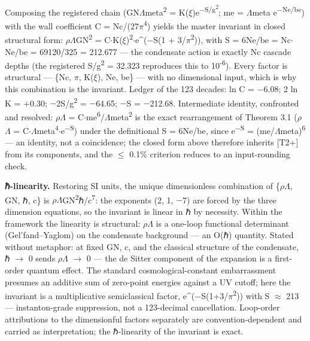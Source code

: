 \documentclass[11pt,letterpaper]{article}
\begin{document}
\noindent Composing the registered chain (GN$\Lambda$meta\textsuperscript{2} = K($\xi$)e\textsuperscript{$-$S/g\textsuperscript{2}}; me = $\Lambda$meta e\textsuperscript{$-$Ne/be}) with the wall coefficient C = Nc/(27$\pi$\textsuperscript{4}) yields the master invariant in closed structural form: $\rho$$\Lambda$GN\textsuperscript{2} = C$\cdot$K($\xi$)\textsuperscript{2}$\cdot$e\textasciicircum{}($-$S(1 + 3/$\pi$\textsuperscript{2})), with S = 6Ne/be = Nc$\cdot$Ne/be = 69120/325 = 212.677 --- the condensate action is exactly Nc cascade depths (the registered S/g\textsuperscript{2} = 32.323 reproduces this to 10\textsuperscript{-6}). Every factor is structural --- \{Nc, $\pi$, K($\xi$), Ne, be\} --- with no dimensional input, which is why this combination is the invariant. Ledger of the 123 decades: ln C = $-$6.08; 2 ln K = +0.30; $-$2S/g\textsuperscript{2} = $-$64.65; $-$S = $-$212.68. Intermediate identity, confronted and resolved: $\rho$$\Lambda$ = C$\cdot$me\textsuperscript{6}/$\Lambda$meta\textsuperscript{2} is the exact rearrangement of Theorem 3.1 ($\rho$$\Lambda$ = C$\cdot$$\Lambda$meta\textsuperscript{4}$\cdot$e\textsuperscript{$-$S}) under the definitional S = 6Ne/be, since e\textsuperscript{$-$S} = (me/$\Lambda$meta)\textsuperscript{6} --- an identity, not a coincidence; the closed form above therefore inherits [T2+] from its components, and the $\le$ 0.1\% criterion reduces to an input-rounding check.

\noindent \textbf{ℏ-linearity. }Restoring SI units, the unique dimensionless combination of \{$\rho$$\Lambda$, GN, ℏ, c\} is $\rho$$\Lambda$GN\textsuperscript{2}ℏ/c\textsuperscript{7}: the exponents (2, 1, $-$7) are forced by the three dimension equations, so the invariant is linear in ℏ by necessity. Within the framework the linearity is structural: $\rho$$\Lambda$ is a one-loop functional determinant (Gel'fand--Yaglom) on the condensate background --- an O(ℏ) quantity. Stated without metaphor: at fixed GN, c, and the classical structure of the condensate, ℏ $\to$ 0 sends $\rho$$\Lambda$ $\to$ 0 --- the de Sitter component of the expansion is a first-order quantum effect. The standard cosmological-constant embarrassment presumes an additive sum of zero-point energies against a UV cutoff; here the invariant is a multiplicative semiclassical factor, e\textasciicircum{}($-$S(1+3/$\pi$\textsuperscript{2})) with S $\approx$ 213 --- instanton-grade suppression, not a 123-decimal cancellation. Loop-order attributions to the dimensionful factors separately are convention-dependent and carried as interpretation; the ℏ-linearity of the invariant is exact.
\end{document}
